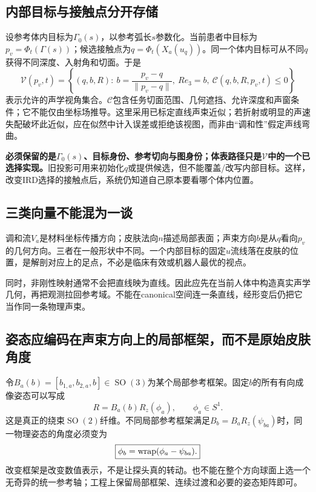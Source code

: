 \documentclass[UTF8,11pt,a4paper,fontset=fandol]{ctexart}
\numberwithin{equation}{section}
\theoremstyle{plain}
\theoremstyle{definition}
\theoremstyle{remark}
\newcommand{\SO}{\operatorname{SO}}\newcommand{\SE}{\operatorname{SE}}
\begin{document}
\subsection{内部目标与接触点分开存储}
设参考体内目标为$\Gamma_0(s)$，以参考弧长$s$参数化。当前患者中目标为$p_v=\Phi_t(\Gamma(s))$；候选接触点为$q=\Phi_t(X_a(u_q))$。同一个体内目标可从不同$q$获得不同深度、入射角和切面。于是
\begin{equation}
 \mathcal V(p_v,t)=\left\{(q,b,R):\ b=\frac{p_v-q}{\|p_v-q\|},\ R e_3=b,\ \mathcal C(q,b,R,p_v,t)\leq0\right\}
 \label{eq:view-set}
\end{equation}
表示允许的声学视角集合。$\mathcal C$包含任务切面范围、几何遮挡、允许深度和声窗条件；它不能仅由坐标场推导。这里采用已标定直线声束近似；若折射或明显的声速失配破坏此近似，应在似然中计入误差或拒绝该视图，而非由“调和性”假定声线弯曲。

\textbf{必须保留的是$\Gamma_0(s)$、目标身份、参考切向与图身份；体表路径只是$\mathcal V$中的一个已选择实现。}旧投影可用来初始化$q$或提供候选，但不能覆盖/改写内部目标。这样，改变IRD选择的接触点后，系统仍知道自己原本要看哪个体内位置。

\subsection{三类向量不能混为一谈}
调和流$V_a$是材料坐标传播方向；皮肤法向$n$描述局部表面；声束方向$b$是从$q$看向$p_v$的几何方向。三者在一般形状中不同。一个内部目标的固定$u$流线落在皮肤的位置，是解剖对应上的足点，不必是临床有效或机器人最优的视点。

同时，非刚性映射通常不会把直线映为直线。因此应先在当前人体中构造真实声学几何，再把观测拉回参考域。不能在canonical空间连一条直线，经形变后仍把它当作同一条物理声束。

\subsection{姿态应编码在声束方向上的局部框架，而不是原始皮肤角度}
令$B_a(b)=[b_{1,a},b_{2,a},b]\in\SO(3)$为某个局部参考框架。固定$b$的所有有向成像姿态可以写成
\begin{equation}
 R=B_a(b)R_z(\phi_a),\qquad \phi_a\in S^1.
 \label{eq:beam-fiber}
\end{equation}
这是真正的绕束$\SO(2)$纤维。不同局部参考框架满足$B_b=B_aR_z(\psi_{ba})$时，同一物理姿态的角度必须变为
\begin{equation}
 \boxed{\phi_b=\operatorname{wrap}(\phi_a-\psi_{ba}).}
 \label{eq:roll-gauge}
\end{equation}
改变框架是改变数值表示，不是让探头真的转动。也不能在整个方向球面上选一个无奇异的统一参考轴；工程上保留局部框架、连续过渡和必要的姿态矩阵即可。
\end{document}

